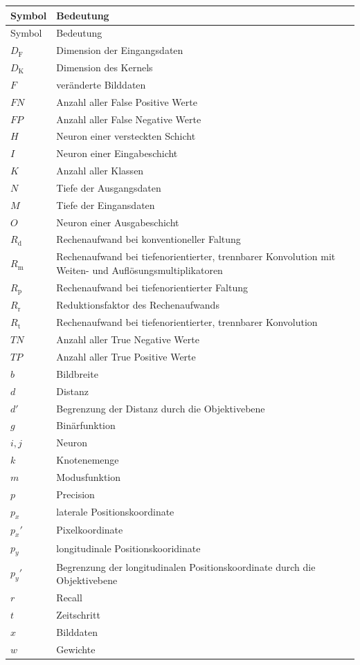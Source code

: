 \documentclass[12pt,a4paper,oneside,numbers=noenddot,headsepline,captions=tableheading,toc=bibliography,openany,tikz,margin=5mm]{scrbook}
\begin{document}
	\begin{longtable}{p{3cm}p{8cm}}
		\setlength\tabcolsep{9pt}
		Symbol & Bedeutung \\ \hline
		\endfirsthead
		Symbol & Bedeutung \\ \hline
		
		\endhead
		\toprule 
		$D_\text{F}$&Dimension der Eingangsdaten\\
		$D_\text{K}$&Dimension des Kernels\\
		$F$&veränderte Bilddaten\\
		$FN$&Anzahl aller False Positive Werte\\
		$FP$&Anzahl aller False Negative Werte\\
		$H$&Neuron einer versteckten Schicht\\
		$I$&Neuron einer Eingabeschicht\\
		$K$&Anzahl aller Klassen\\
		$N$&Tiefe der Ausgangsdaten\\
		$M$&Tiefe der Eingansdaten\\
		$O$&Neuron einer Ausgabeschicht\\
		$R_\text{d}$&Rechenaufwand bei konventioneller Faltung\\
		$R_\text{m}$&Rechenaufwand bei tiefenorientierter, trennbarer Konvolution mit Weiten- und Auflösungsmultiplikatoren\\ 
		$R_\text{p}$&Rechenaufwand bei tiefenorientierter Faltung\\
		$R_\text{r}$&Reduktionsfaktor des Rechenaufwands\\
		$R_\text{t}$&Rechenaufwand bei tiefenorientierter, trennbarer Konvolution\\
		$TN$&Anzahl aller True Negative Werte\\
		$TP$&Anzahl aller True Positive Werte\\
		
		$b$&Bildbreite\\
		$d$&Distanz\\
		$d'$&Begrenzung der Distanz durch die Objektivebene\\
		$g$&Binärfunktion\\
		$i, j$&Neuron\\
		$k$&Knotenemenge\\
		$m$&Modusfunktion\\
		$p$&Precision\\
		$p_x$&laterale Positionskoordinate\\
		$p_x'$&Pixelkoordinate\\
		$p_y$&longitudinale Positionskooridinate\\
		$p_y'$&Begrenzung der longitudinalen Positionskoordinate durch die Objektivebene\\
		$r$&Recall\\
		$t$&Zeitschritt\\
		$x$&Bilddaten\\
		$w$&Gewichte	\\ 
		

\end{longtable}
\end{document}
